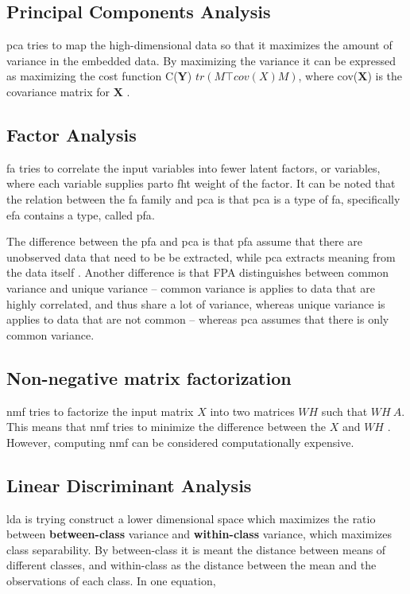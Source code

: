 \subsection{Principal Components Analysis}\label{subsec:principal-components-analysis}
\gls{pca} tries to map the high-dimensional data so that it maximizes the amount of variance in the embedded data. By maximizing the variance it can be expressed as maximizing the cost function C($\mathbf{Y}$) $tr(M\top cov(X)M)$, where cov($\mathbf{X}$) is the covariance matrix for $\mathbf{X}$ \cite{dimensionality-reduction-comparative-review}.

\subsection{Factor Analysis}\label{subsec:factor-analysis}
\gls{fa} tries to correlate the input variables into fewer latent factors, or variables, where each variable supplies parto fht weight of the factor. It can be noted that the relation between the \gls{fa} family and \gls{pca} is that \gls{pca} is a type of \gls{fa}, specifically \gls{efa}  contains a type, called \gls{pfa}.

The difference between the \gls{pfa} and \gls{pca} is that \gls{pfa} assume that there are unobserved data that need to be be extracted, while \gls{pca} extracts meaning from the data itself \cite{factor-analysis-introduction}. Another difference is that FPA distinguishes between common variance and unique variance -- common variance is applies to data that are highly correlated, and thus share a lot of variance, whereas unique variance is applies to data that are not common -- whereas \gls{pca} assumes that there is only common variance.

\subsection{Non-negative matrix factorization }\label{subsec:non-negative-matrix-factorization}
\gls{nmf} tries to factorize the input matrix $X$ into two matrices $WH$ such that $WH ~ A$. This means that \gls{nmf} tries to minimize the difference between the $X$ and $WH$ \cite{non-negative-matrix-factorization}. However, computing \gls{nmf} can be considered computationally expensive.

\subsection{Linear Discriminant Analysis}\label{subsec:linear-discriminant-analysis}
\gls{lda} is trying construct a lower dimensional space which maximizes the ratio between \textbf{between-class} variance and \textbf{within-class} variance, which maximizes class separability. By between-class it is meant the distance between means of different classes, and within-class as the distance between the mean and the observations of each class. In one equation,


